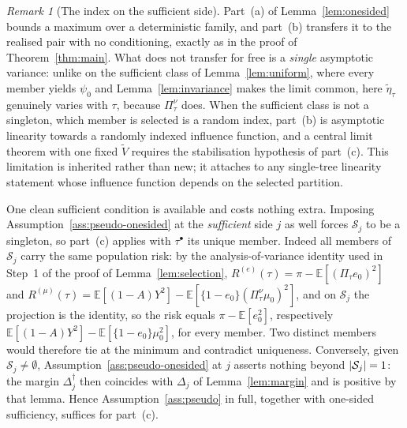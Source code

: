 \documentclass[11pt]{article}
\theoremstyle{plain}
\theoremstyle{definition}
\theoremstyle{remark}
\newtheorem{remark}[theorem]{Remark}
\newcommand{\E}{\mathbb{E}}
\newcommand{\cS}{\mathcal{S}}
\newcommand{\ez}{e_0}
\newcommand{\mz}{\mu_0}
\DeclarePairedDelimiter{\card}{\lvert}{\rvert}
\newcommand{\etatil}{\widetilde{\eta}}
\newcommand{\Vtil}{\widetilde{V}}
\begin{document}
\begin{remark}[The index on the sufficient side]
\label{rem:onesided-random-index}
Part~(a) of Lemma~\ref{lem:onesided} bounds a maximum over a deterministic
family, and part~(b) transfers it to the realised pair with no conditioning,
exactly as in the proof of Theorem~\ref{thm:main}. What does not transfer for
free is a \emph{single} asymptotic variance: unlike on the sufficient class of
Lemma~\ref{lem:uniform}, where every member yields $\psi_0$ and
Lemma~\ref{lem:invariance} makes the limit common, here $\etatil_\tau$ genuinely
varies with $\tau$, because $\Pi^\nu_\tau$ does. When the sufficient class is
not a singleton, which member is selected is a random index, part~(b) is
asymptotic linearity towards a randomly indexed influence function, and a
central limit theorem with one fixed $\Vtil$ requires the stabilisation hypothesis
of part~(c). This limitation is inherited rather than new; it attaches to any
single-tree linearity statement whose influence function depends on the selected
partition.

One clean sufficient condition is available and costs nothing extra. Imposing
Assumption~\ref{ass:pseudo-onesided} at the \emph{sufficient} side $j$ as well
forces $\cS_j$ to be a singleton, so part~(c) applies with
$\tau^\bullet$ its unique member. Indeed all members of $\cS_j$ carry the same
population risk: by the analysis-of-variance identity used in Step~1 of the
proof of Lemma~\ref{lem:selection},
$R^{(e)}(\tau)=\pi-\E[(\Pi_\tau\ez)^2]$ and
$R^{(\mu)}(\tau)=\E[(1-A)Y^2]-\E[\{1-\ez\}(\Pi^\nu_\tau\mz)^2]$, and on $\cS_j$
the projection is the identity, so the risk equals $\pi-\E[\ez^2]$, respectively
$\E[(1-A)Y^2]-\E[\{1-\ez\}\mz^2]$, for every member. Two distinct members would
therefore tie at the minimum and contradict uniqueness. Conversely, given
$\cS_j\ne\emptyset$, Assumption~\ref{ass:pseudo-onesided} at $j$ asserts nothing
beyond $\card{\cS_j}=1$: the margin $\Delta^\dagger_j$ then coincides with
$\Delta_j$ of Lemma~\ref{lem:margin} and is positive by that lemma. Hence
Assumption~\ref{ass:pseudo} in full, together with one-sided sufficiency,
suffices for part~(c).
\end{remark}
\end{document}
